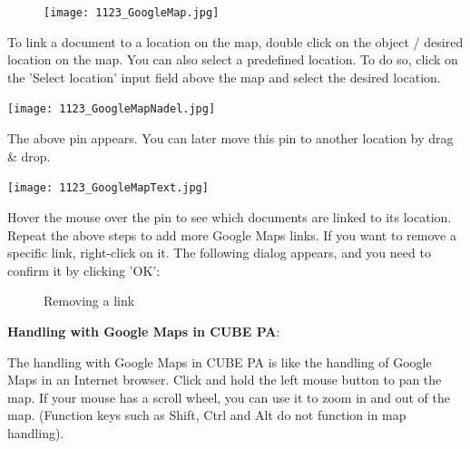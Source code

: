 \vspace{2mm}

\begin{figure}
\vspace{-15pt}
\texttt{[image: 1123\_GoogleMap.jpg]}
\end{figure}

To link a document to a location on the map, double click on the object / desired location on the map. You can also select a predefined location. To do so, click on the 'Select location' input field above the map and select the desired location.

\vspace{4mm}

\hspace{15mm} \texttt{[image: 1123\_GoogleMapNadel.jpg]}

The above pin appears. You can later move this pin to another location by drag \& drop. 

\hspace{15mm} \texttt{[image: 1123\_GoogleMapText.jpg]}

Hover the mouse over the pin to see which documents are linked to its location. \\

Repeat the above steps to add more Google Maps links. If you want to remove a specific link, right-click on it. The following dialog appears, and you need to confirm it by clicking 'OK':

\begin{figure}[H]
\caption{Removing a link}
\end{figure}

\vspace{\baselineskip}

\textbf{Handling with Google Maps in CUBE PA}:

The handling with Google Maps in CUBE PA is like the handling of Google Maps in an Internet browser. Click and hold the left mouse button to pan the map. If your mouse has a scroll wheel, you can use it to zoom in and out of the map. (Function keys such as Shift, Ctrl and Alt do not function in map handling).

